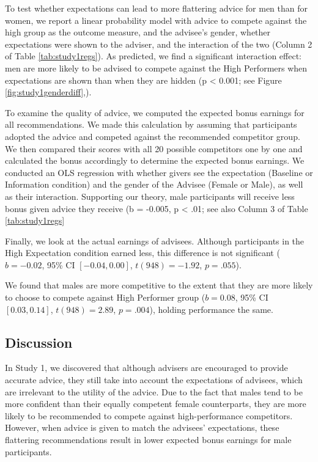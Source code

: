\documentclass[
  man,floatsintext]{apa6}
\begin{document}
To test whether expectations can lead to more flattering advice for men than for women, we report a linear probability model with advice to compete against the high group as the outcome measure, and the advisee's gender, whether expectations were shown to the adviser, and the interaction of the two (Column 2 of Table \ref{tab:study1regs}). As predicted, we find a significant interaction effect: men are more likely to be advised to compete against the High Performers when expectations are shown than when they are hidden (p \textless{} 0.001; see Figure \ref{fig:study1genderdiff},).

To examine the quality of advice, we computed the expected bonus earnings for all recommendations. We made this calculation by assuming that participants adopted the advice and competed against the recommended competitor group. We then compared their scores with all 20 possible competitors one by one and calculated the bonus accordingly to determine the expected bonus earnings. We conducted an OLS regression with whether givers see the expectation (Baseline or Information condition) and the gender of the Advisee (Female or Male), as well as their interaction. Supporting our theory, male participants will receive less bonus given advice they receive (b = -0.005, p \textless{} .01; see also Column 3 of Table \ref{tab:study1regs}

Finally, we look at the actual earnings of advisees. Although participants in the High Expectation condition earned less, this difference is not significant (\(b = -0.02\), 95\% CI \([-0.04, 0.00]\), \(t(948) = -1.92\), \(p = .055\)).

We found that males are more competitive to the extent that they are more likely to choose to compete against High Performer group (\(b = 0.08\), 95\% CI \([0.03, 0.14]\), \(t(948) = 2.89\), \(p = .004\)), holding performance the same.

\hypertarget{discussion}{%
\subsection{Discussion}\label{discussion}}

In Study 1, we discovered that although advisers are encouraged to provide accurate advice, they still take into account the expectations of advisees, which are irrelevant to the utility of the advice. Due to the fact that males tend to be more confident than their equally competent female counterparts, they are more likely to be recommended to compete against high-performance competitors. However, when advice is given to match the advisees' expectations, these flattering recommendations result in lower expected bonus earnings for male participants.
\end{document}
